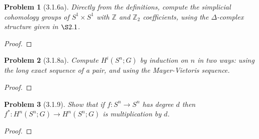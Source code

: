 \documentclass[10pt]{article}
\newcommand{\sk}{\vskip 10mm}
\newcommand{\bb}[1]{\mathbb{#1}}
\theoremstyle{plain}
\newtheorem{problem}{Problem}
\theoremstyle{remark}
\begin{document}
\begin{problem}[3.1.6a]
  Directly from the definitions, compute the simplicial cohomology groups of
  $S^1\times S^1$ with $\bb{Z}$ and $\bb{Z}_2$ coefficients, using the
  $\Delta$-complex structure given in $\S 2.1$.
\end{problem}

\begin{proof}
  
\end{proof}

\sk

\begin{problem}[3.1.8a]
  Compute $H^i(S^n;G)$ by induction on $n$ in two ways: using the long exact
  sequence of a pair, and using the Mayer-Vietoris sequence.
\end{problem}

\begin{proof}
  
\end{proof}

\sk

\begin{problem}[3.1.9]
  Show that if $f:S^n\rightarrow S^n$ has degree $d$ then
  $f^*:H^n(S^n;G)\rightarrow H^n(S^n;G)$ is multiplication by $d$.
\end{problem}

\begin{proof}
  
\end{proof}

\end{document}
